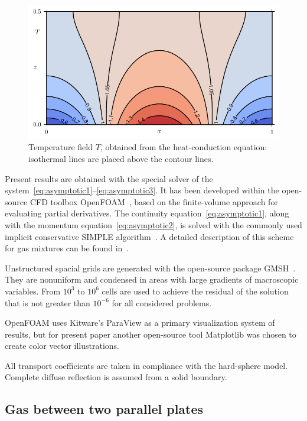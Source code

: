 \documentclass[smallextended, referee]{svjour3} %
\begin{document}
\begin{figure}[ht]
	\centering
	\includegraphics{Fig4}
	\caption{Temperature field \(T\), obtained from the heat-conduction equation:
		isothermal lines are placed above the contour lines.}
	\label{fig:moving:T_heat}
\end{figure}

Present results are obtained with the special solver of the system~\eqref{eq:asymptotic1}--\eqref{eq:asymptotic3}.
It has been developed within the open-source CFD toolbox OpenFOAM\textregistered{}~\cite{OpenFOAM1998},
based on the finite-volume approach for evaluating partial derivatives.
The continuity equation~\eqref{eq:asymptotic1}, along with the momentum equation~\eqref{eq:asymptotic2},
is solved with the commonly used implicit conservative SIMPLE algorithm~\cite{SIMPLE}.
A detailed description of this scheme for gas mixtures can be found in~\cite{Laneryd2007}.

Unstructured spacial grids are generated with the open-source package GMSH~\cite{GMSH}.
They are nonuniform and condensed in areas with large gradients of macroscopic variables.
From \(10^3\) to \(10^6\) cells are used to achieve the residual of the solution
that is not greater than \(10^{-6}\) for all considered problems.

OpenFOAM\textregistered{} uses Kitware's ParaView\textregistered{} as a primary visualization system of results,
but for present paper another open-source tool Matplotlib was chosen to create color vector illustrations.

All transport coefficients are taken in compliance with the hard-sphere model.
Complete diffuse reflection is assumed from a solid boundary.

\subsection{Gas between two parallel plates}
\end{document}
